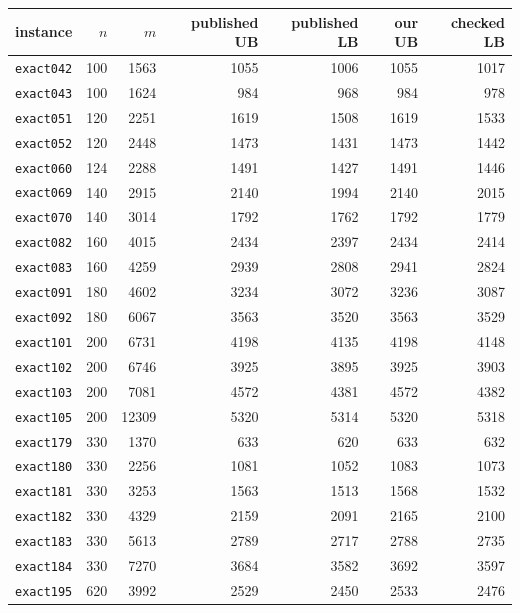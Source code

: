 \begin{tabular}{lrrrrrr}
\toprule
instance & $n$ & $m$ & published UB & published LB & our UB & checked LB \\
\midrule
\texttt{exact042} & 100 & 1563 & \num{1055} & \num{1006} & \num{1055} & \num{1017} \\
\texttt{exact043} & 100 & 1624 & \num{984} & \num{968} & \num{984} & \num{978} \\
\texttt{exact051} & 120 & 2251 & \num{1619} & \num{1508} & \num{1619} & \num{1533} \\
\texttt{exact052} & 120 & 2448 & \num{1473} & \num{1431} & \num{1473} & \num{1442} \\
\texttt{exact060} & 124 & 2288 & \num{1491} & \num{1427} & \num{1491} & \num{1446} \\
\texttt{exact069} & 140 & 2915 & \num{2140} & \num{1994} & \num{2140} & \num{2015} \\
\texttt{exact070} & 140 & 3014 & \num{1792} & \num{1762} & \num{1792} & \num{1779} \\
\texttt{exact082} & 160 & 4015 & \num{2434} & \num{2397} & \num{2434} & \num{2414} \\
\texttt{exact083} & 160 & 4259 & \num{2939} & \num{2808} & \num{2941} & \num{2824} \\
\texttt{exact091} & 180 & 4602 & \num{3234} & \num{3072} & \num{3236} & \num{3087} \\
\texttt{exact092} & 180 & 6067 & \num{3563} & \num{3520} & \num{3563} & \num{3529} \\
\texttt{exact101} & 200 & 6731 & \num{4198} & \num{4135} & \num{4198} & \num{4148} \\
\texttt{exact102} & 200 & 6746 & \num{3925} & \num{3895} & \num{3925} & \num{3903} \\
\texttt{exact103} & 200 & 7081 & \num{4572} & \num{4381} & \num{4572} & \num{4382} \\
\texttt{exact105} & 200 & 12309 & \num{5320} & \num{5314} & \num{5320} & \num{5318} \\
\texttt{exact179} & 330 & 1370 & \num{633} & \num{620} & \num{633} & \num{632} \\
\texttt{exact180} & 330 & 2256 & \num{1081} & \num{1052} & \num{1083} & \num{1073} \\
\texttt{exact181} & 330 & 3253 & \num{1563} & \num{1513} & \num{1568} & \num{1532} \\
\texttt{exact182} & 330 & 4329 & \num{2159} & \num{2091} & \num{2165} & \num{2100} \\
\texttt{exact183} & 330 & 5613 & \num{2789} & \num{2717} & \num{2788} & \num{2735} \\
\texttt{exact184} & 330 & 7270 & \num{3684} & \num{3582} & \num{3692} & \num{3597} \\
\texttt{exact195} & 620 & 3992 & \num{2529} & \num{2450} & \num{2533} & \num{2476} \\
\bottomrule
\end{tabular}
